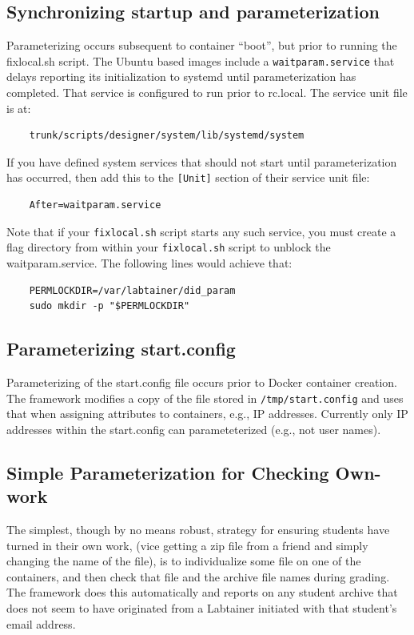 \documentclass[12pt]{article}
\begin{document}
\subsection{Synchronizing startup and parameterization}
Parameterizing occurs subsequent to container ``boot'', but prior to running the fixlocal.sh script.
The Ubuntu based images include a {\tt waitparam.service} that delays reporting its initialization to
systemd until parameterization has completed.  That service is configured to run prior to rc.local.
The service unit file is at:
\begin{verbatim}
    trunk/scripts/designer/system/lib/systemd/system
\end{verbatim}
If you have defined system services that should not start until parameterization has occurred, then
add this to the {\tt[Unit]} section of their service unit file:
\begin{verbatim}
    After=waitparam.service
\end{verbatim}
\noindent Note that if your {\tt fixlocal.sh} script starts any such service, you must create a flag
directory from within your {\tt fixlocal.sh} script to unblock the waitparam.service.  The following
lines would achieve that:
\begin{verbatim}
    PERMLOCKDIR=/var/labtainer/did_param
    sudo mkdir -p "$PERMLOCKDIR"
\end{verbatim}

\subsection{Parameterizing start.config}
Parameterizing of the start.config file occurs prior to Docker container creation.  The framework 
modifies a copy of the file stored in {\tt /tmp/start.config} and uses that when assigning attributes to containers,
e.g., IP addresses. Currently only IP addresses within the start.config can parameteterized (e.g., not user names).

\subsection{Simple Parameterization for Checking Own-work}
The simplest, though by no means robust, strategy for ensuring students
have turned in their own work, (vice getting a zip file from a friend and simply
changing the name of the file), is to individualize some file on one of the containers,
and then check that file and the archive file names during grading.  The framework does
this automatically and reports on any student archive that does not seem to have
originated from a Labtainer initiated with that student's email address.
\end{document}
